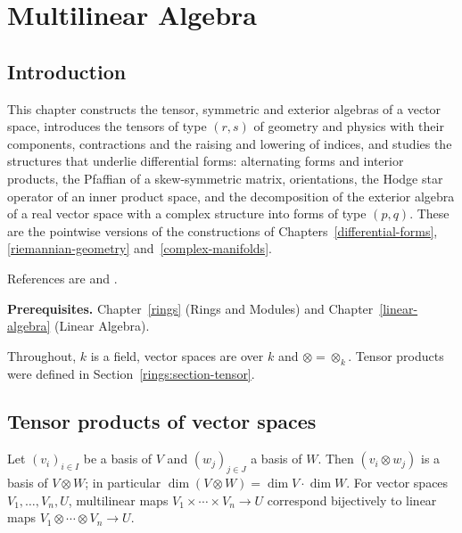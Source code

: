 \chapter{Multilinear Algebra}\label{multilinear-algebra}

\section{Introduction}\label{multilinear-algebra:section-introduction}

This chapter constructs the tensor, symmetric and exterior algebras of a vector space, introduces the
tensors of type $(r,s)$ of geometry and physics with their components, contractions and the raising and
lowering of indices, and studies the structures that underlie differential forms: alternating forms and interior products,
the Pfaffian of a skew-symmetric matrix, orientations, the Hodge star operator of an inner product space, and the decomposition of the
exterior algebra of a real vector space with a complex structure into forms of type $(p,q)$. These are
the pointwise versions of the constructions of Chapters~\ref{differential-forms},
\ref{riemannian-geometry} and~\ref{complex-manifolds}.

References are \cite[Chapters XVI and XIX]{lang-algebra} and \cite{greub-multilinear}.

\noindent\textbf{Prerequisites.} Chapter~\ref{rings} (Rings and Modules) and
Chapter~\ref{linear-algebra} (Linear Algebra).

Throughout, $k$ is a field, vector spaces are over $k$ and $\otimes = \otimes_k$. Tensor products were
defined in Section~\ref{rings:section-tensor}.

\section{Tensor products of vector spaces}\label{multilinear-algebra:section-tensor-products}

\begin{proposition}\label{multilinear-algebra:proposition-tensor-basis}
Let $(v_i)_{i \in I}$ be a basis of $V$ and $(w_j)_{j \in J}$ a basis of $W$. Then $(v_i \otimes w_j)$ is a basis of
$V \otimes W$; in particular $\dim(V \otimes W) = \dim V \cdot \dim W$. For vector spaces
$V_1, \ldots, V_n, U$, multilinear maps $V_1 \times \cdots \times V_n \to U$ correspond bijectively to linear maps
$V_1 \otimes \cdots \otimes V_n \to U$.
\end{proposition}

